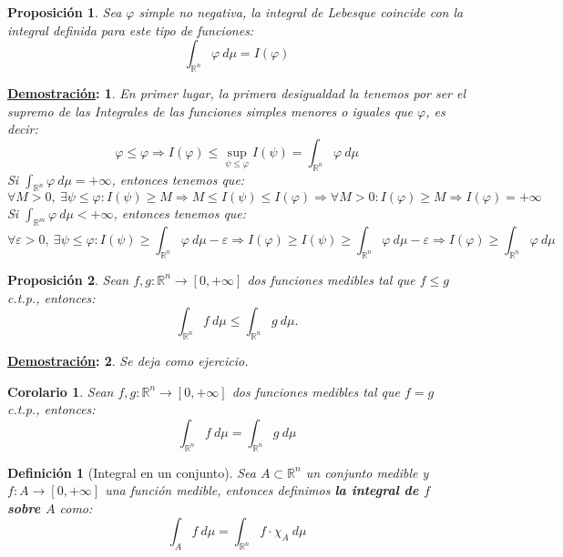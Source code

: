 \documentclass[10pt,a4paper,openright]{book}
\theoremstyle{break}
\newtheorem*{defi}{Definición}
\newtheorem*{coro}{Corolario}
\newtheorem*{prop}{Proposición}
\newtheorem*{demo}{\underline{Demostración}:}
\begin{document}
\begin{prop}
Sea $\varphi$ simple no negativa, la integral de Lebesque coincide con la integral definida para este tipo de funciones:
$$\int_{\mathbb{R}^n}\varphi \ d \mu = I\left(\varphi\right)$$
\end{prop}
\begin{demo}
En primer lugar, la primera desigualdad la tenemos por ser el supremo de las Integrales de las funciones simples menores o iguales que $\varphi$, es decir:
$$\varphi \le \varphi \Rightarrow I\left(\varphi\right) \leq \sup_{\psi \leq \varphi} I(\psi) = \int_{\mathbb{R}^n} \varphi \ d \mu $$
Si $\int_{\mathbb{R}^n} \varphi \ d \mu = +\infty$, entonces tenemos que:
$$\forall M > 0,\ \exists \psi \le \varphi: I\left(\psi\right) \ge M \Rightarrow M \le I\left(\psi\right) \le I\left(\varphi\right) \Rightarrow \forall M > 0: I\left(\varphi\right) \ge M \Rightarrow I\left(\varphi\right) = +\infty$$
Si $\int_{\mathbb{R}^m}\varphi \ d \mu < +\infty$, entonces tenemos que:
$$\forall \varepsilon > 0,\ \exists \psi \le \varphi: I\left(\psi\right) \ge \int_{\mathbb{R}^n}\varphi \ d \mu - \varepsilon \Rightarrow I\left(\varphi\right) \ge I(\psi) \geq  \int_{\mathbb{R}^n}\varphi \ d \mu - \varepsilon \Rightarrow I\left(\varphi\right) \ge \int_{\mathbb{R}^n}\varphi \ d \mu$$
\end{demo}

\begin{prop}
Sean $f, g: \mathbb{R}^n \rightarrow \left[0, +\infty\right]$ dos funciones medibles tal que $f \le g$ c.t.p., entonces:
$$\int_{\mathbb{R}^n}f \ d \mu \le \int_{\mathbb{R}^n}g \ d \mu.$$
\end{prop}
\begin{demo}
Se deja como ejercicio.
\end{demo}

\begin{coro}
Sean $f, g: \mathbb{R}^n \rightarrow \left[0, +\infty\right]$ dos funciones medibles tal que $f = g$ c.t.p., entonces:
$$\int_{\mathbb{R}^n}f \ d \mu = \int_{\mathbb{R}^n} g \ d \mu$$
\end{coro}

\begin{defi}[Integral en un conjunto]
Sea $A \subset \mathbb{R}^n$ un conjunto medible y $f: A \rightarrow \left[0, +\infty\right]$ una función medible, entonces definimos \textbf{la integral de $f$ sobre $A$} como:
$$\int_A f \ d \mu = \int_{\mathbb{R}^n}f \cdot \chi_{A} \ d \mu$$
\end{defi}
\end{document}
